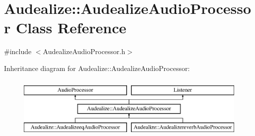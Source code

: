 \hypertarget{class_audealize_1_1_audealize_audio_processor}{}\section{Audealize\+:\+:Audealize\+Audio\+Processor Class Reference}
\label{class_audealize_1_1_audealize_audio_processor}


{\ttfamily \#include $<$Audealize\+Audio\+Processor.\+h$>$}

Inheritance diagram for Audealize\+:\+:Audealize\+Audio\+Processor\+:\begin{figure}[H]
\begin{center}
\leavevmode
\includegraphics[height=3.000000cm]{class_audealize_1_1_audealize_audio_processor}
\end{center}
\end{figure}
